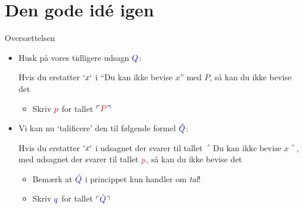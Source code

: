 \documentclass{beamer}
\newcommand{\godel}[1]{\ulcorner #1 \urcorner}
\begin{document}
\section{Den gode idé igen}
\begin{frame}{Oversættelsen}
  \begin{itemize}
    \item Husk på vores tidligere udsagn $\color{blue}Q$:
    \begin{adjustwidth}{0.5cm}{0pt}
    {\small\color{darkgray}
      Hvis du erstatter $`x`$ i ``Du kan ikke bevise $x$'' med {\color{red}$P$}, så kan du ikke bevise det
    }
    \end{adjustwidth}
    \begin{itemize}
      \pause\item Skriv $\color{red} p$ for tallet $\godel{{\color{red} P}}$
    \end{itemize}
    \pause\item Vi kan nu `talificere' den til følgende formel $\color{blue}\hat Q$:
    \begin{adjustwidth}{0.5cm}{0pt}
    {\small\color{darkgray}
      Hvis du erstatter $`x`$ i udsagnet der svarer til tallet $\godel{\text{Du kan ikke bevise $x$}}$, med udsagnet der svarer til tallet $\color{red}p$, så kan du ikke bevise det
    }
    \end{adjustwidth}
    \begin{itemize}
      \pause\item Bemærk at $\color{blue}\hat Q$ i princippet kun handler om \textit{tal}!
      \pause\item Skriv $\color{blue} q$ for tallet $\godel{{\color{blue}\hat Q}}$
    \end{itemize}
  \end{itemize}
\end{frame}
\end{document}
